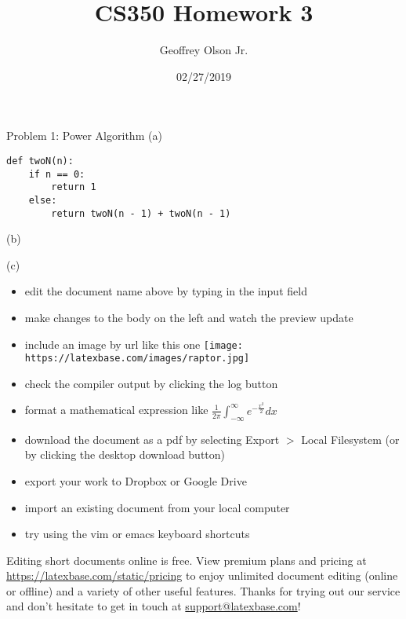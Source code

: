 \documentclass[12pt]{article}
\title{CS350 Homework 3}
\author{Geoffrey Olson Jr.}
\date{02/27/2019}
\begin{document}
\maketitle

Problem 1: Power Algorithm
(a)
\begin{lstlisting}
def twoN(n):
    if n == 0:
        return 1
    else:
        return twoN(n - 1) + twoN(n - 1)
\end{lstlisting}
(b)

(c)
\begin{itemize}
  \item edit the document name above by typing in the input field
  \item make changes to the body on the left and watch the preview update
  \item include an image by url like this one
        \hspace*{3em}
        \texttt{[image: https://latexbase.com/images/raptor.jpg]}
  \item check the compiler output by clicking the log button
  \item format a mathematical expression like
        $\frac{1}{2\pi}\int_{-\infty}^{\infty}e^{-\frac{x^2}{2}}dx$
  \item download the document as a pdf by selecting Export $>$ Local
        Filesystem (or by clicking the desktop download button)
  \item export your work to Dropbox or Google Drive
  \item import an existing document from your local computer
  \item try using the vim or emacs keyboard shortcuts
\end{itemize}

Editing short documents online is free. View premium plans and pricing at
\url{https://latexbase.com/static/pricing} to enjoy unlimited document editing
(online or offline) and a variety of other useful features. Thanks for trying
out our service and don't hesitate to get in touch at
\href{mailto:support@latexbase.com}{support@latexbase.com}!
\end{document}
